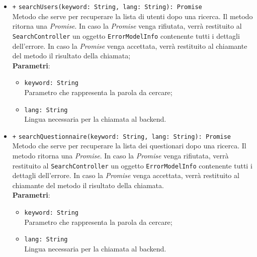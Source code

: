 \begin{itemize}
\begin{itemize}
		\item \texttt{+} \texttt{searchUsers(keyword: String, lang: String): Promise} \\Metodo che serve per recuperare la lista di utenti dopo una ricerca. Il metodo ritorna una \textit{Promise}. In caso la \textit{Promise} venga rifiutata, verrà restituito al \\ \texttt{SearchController} un oggetto \texttt{ErrorModelInfo} contenente tutti i dettagli dell'errore. In caso la \textit{Promise} venga accettata, verrà restituito al chiamante del metodo il risultato della chiamata;\\
		\textbf{Parametri}:
		\begin{itemize}
			\item \texttt{keyword: String} \\ Parametro che rappresenta la parola da cercare;
			\item \texttt{lang: String} \\ Lingua necessaria per la chiamata al backend.
		\end{itemize}
		\item \texttt{+} \texttt{searchQuestionnaire(keyword: String, lang: String): Promise} \\Metodo che serve per recuperare la lista dei questionari dopo una ricerca. Il metodo ritorna una \textit{Promise}. In caso la \textit{Promise} venga rifiutata, verrà restituito al \texttt{SearchController} un oggetto \texttt{ErrorModelInfo} contenente tutti i dettagli dell'errore. In caso la \textit{Promise} venga accettata, verrà restituito al chiamante del metodo il risultato della chiamata.\\
		\textbf{Parametri}:
		\begin{itemize}
			\item \texttt{keyword: String} \\ Parametro che rappresenta la parola da cercare;
			\item \texttt{lang: String} \\ Lingua necessaria per la chiamata al backend.
		\end{itemize}
	\end{itemize}
\end{itemize}
